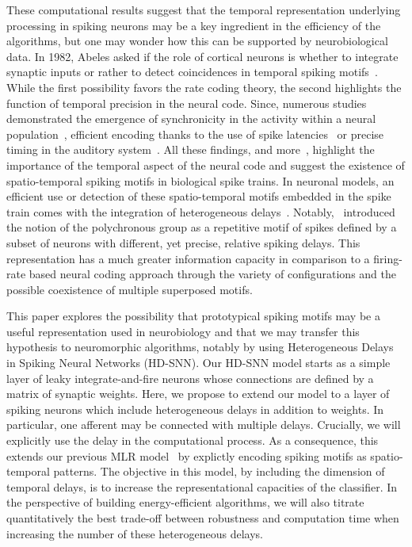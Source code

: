 \documentclass[default]{sn-jnl}%
\theoremstyle{thmstyleone}%
\theoremstyle{thmstyletwo}%
\theoremstyle{thmstylethree}%
\begin{document}
These computational results suggest that the temporal representation underlying processing in spiking neurons may be a key ingredient in the efficiency of the algorithms, but one may wonder how this can be supported by neurobiological data. In 1982, Abeles asked if the role of cortical neurons is whether to integrate synaptic inputs or rather to detect coincidences in temporal spiking motifs~\citep{abeles_role_1982}. While the first possibility favors the rate coding theory, the second highlights the function of temporal precision in the neural code. Since, numerous studies demonstrated the emergence of synchronicity in the activity within a neural population~\citep{riehle_spike_1997, davis_spontaneous_2021}, efficient encoding thanks to the use of spike latencies~\citep{perrinet_coding_2004, gollisch_rapid_2008} or precise timing in the auditory system~\citep{deweese_binary_2002, carr_circuit_1990}. All these findings, and more~\citep{bohte_evidence_2004}, highlight the importance of the temporal aspect of the neural code and suggest the existence of spatio-temporal spiking motifs in biological spike trains. In neuronal models, an efficient use or detection of these spatio-temporal motifs embedded in the spike train comes with the integration of heterogeneous delays~\citep{gutig_tempotron_2006, guise_bayesian_2014, zhang_supervised_2020}. Notably,~\citet{izhikevich_polychronization_2006} introduced the notion of the polychronous group as a repetitive motif of spikes defined by a subset of neurons with different, yet precise, relative spiking delays. This representation has a much greater information capacity in comparison to a firing-rate based neural coding approach through the variety of configurations and the possible coexistence of multiple superposed motifs.

This paper explores the possibility that prototypical spiking motifs may be a useful representation used in neurobiology and that we may transfer this hypothesis to neuromorphic algorithms, notably by using Heterogeneous Delays in Spiking Neural Networks (HD-SNN). Our HD-SNN model starts as a simple layer of leaky integrate-and-fire neurons whose connections are defined by a matrix of synaptic weights. Here, we propose to extend our model to a layer of spiking neurons which include heterogeneous delays in addition to weights. In particular, one afferent may be connected with multiple delays. Crucially, we will explicitly use the delay in the computational process. As a consequence, this extends our previous MLR model~\citep{grimaldi_robust_2022} by explictly encoding spiking motifs as spatio-temporal patterns. The objective in this model, by including the dimension of temporal delays, is to increase the representational capacities of the classifier. In the perspective of building energy-efficient algorithms, we will also titrate quantitatively the best trade-off between robustness and computation time when increasing the number of these heterogeneous delays. %
%
\end{document}
